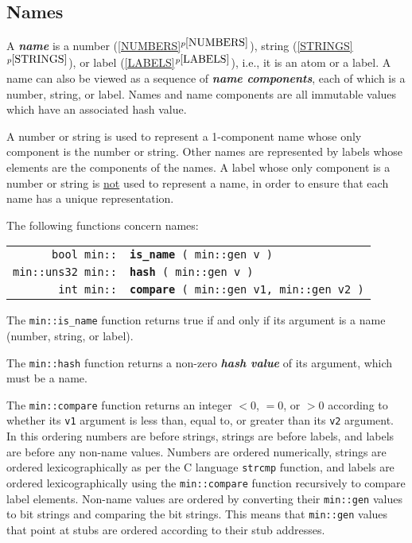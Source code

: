 \documentclass[12pt]{article}
\makeatletter
\newcommand{\key}[1]{{\bf \em #1}\index{#1}}
\newcommand{\skey}[2]{{\bf \em #1#2}\index{#1}}
\newcommand{\ttindex}[1]{\index{#1@{\tt #1}}}
\newcommand{\minindex}[1]{\ttindex{min::#1}\ttindex{#1}}
\newcommand{\itemref}[1]{\ref{#1}$^{p\pageref{#1}}$}
\newcommand{\EOL}{\penalty \exhyphenpenalty}
\newenvironment{indpar}[1][0.3in]%
	{\begin{list}{}%
		     {\setlength{\itemsep}{0in}%
		      \setlength{\topsep}{0in}%
		      \setlength{\parsep}{1ex}%
		      \setlength{\labelwidth}{#1}%
		      \setlength{\leftmargin}{#1}%
		      \addtolength{\leftmargin}{\labelsep}}%
	 \item}%
	{\end{list}}
\newcommand{\LABEL}[1]{\label{#1}}
\newcommand{\MINKEY}[1]{{\tt \bf #1}\minindex{#1}}
\makeatother
\begin{document}
\subsection{Names}
\label{NAMES}

A \key{name} is a
number (\itemref{NUMBERS}),
string (\itemref{STRINGS}),
or label (\itemref{LABELS}), i.e., it is an atom or a label.
A name can also be viewed as
a sequence of \skey{name component}s, each of which is a number, string,
or label.
Names and name components are all immutable values which have an associated
hash value.

A number or string is used to represent a 1-component name whose
only component is the number or string.  Other names are represented
by labels whose elements are the components of the names.  A label whose
only component is a number or string is \underline{not}
used to represent a name, in order to ensure that each name has a unique
representation.

The following functions concern names:

\begin{indpar}\begin{tabular}{r@{}l}
\verb|bool min::| & \MINKEY{is\_name}\verb| ( min::gen v )|
\LABEL{MIN::IS_NAME} \\
\verb|min::uns32 min::| & \MINKEY{hash}\verb| ( min::gen v )|
\LABEL{MIN::HASH} \\
\verb|int min::| & \MINKEY{compare}\verb| ( min::gen v1, min::gen v2 )|
\LABEL{MIN::COMPARE} \\
\end{tabular}\end{indpar}

The \verb|min::is_name| function returns true if and only if its argument is
a name (number, string, or label).

The \verb|min::hash| function returns a non-zero
\key{hash value}\label{HASH-VALUE} of its argument, which must be
a name.

The \verb|min::compare| function returns an integer $<0$, $=0$, or $>0$
according to whether its \verb|v1| argument is less than, equal to, or
greater than its \verb|v2| argument.
In this ordering numbers are
before strings, strings are before labels, and labels are before
any non-name values.  Numbers are ordered
numerically, strings are ordered lexicographically as per the
C language \verb|strcmp| function, and labels are ordered lexicographically
using the {\tt min::\EOL compare} function recursively to compare
label elements.  Non-name values are ordered by converting their
\verb|min::gen| values to bit strings and comparing the bit strings.
This means that \verb|min::gen| values that point at stubs are ordered
according to their stub addresses.
\end{document}
